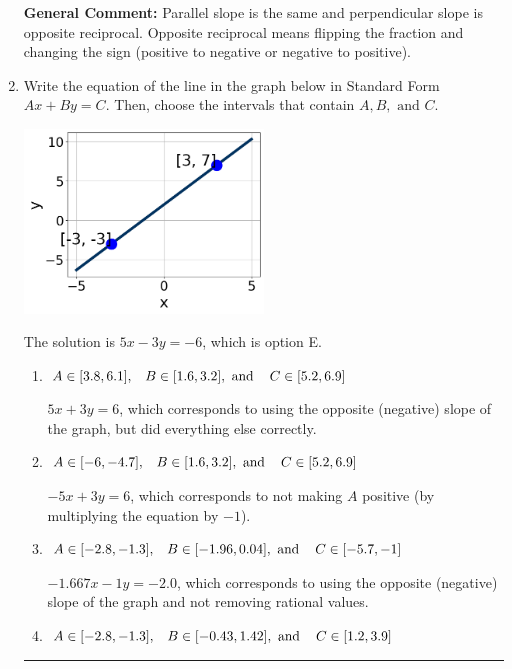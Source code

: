 \documentclass{extbook}[14pt]
\newcommand{\litem}[1]{\item #1

\rule{\textwidth}{0.4pt}}
\begin{document}
\begin{enumerate}
{\textbf{General Comment:} Parallel slope is the same and perpendicular slope is opposite reciprocal. Opposite reciprocal means flipping the fraction and changing the sign (positive to negative or negative to positive).
}
\litem{
Write the equation of the line in the graph below in Standard Form $Ax+By=C$. Then, choose the intervals that contain $A, B, \text{ and } C$.

\begin{center}
    \includegraphics[width=0.5\textwidth]{../Figures/linearGraphToStandardCopyB.png}
\end{center}


The solution is \( 5x - 3y = -6 \), which is option E.\begin{enumerate}[label=\Alph*.]
\item \( A \in [3.8, 6.1], \hspace{3mm} B \in [1.6, 3.2], \text{ and } \hspace{3mm} C \in [5.2, 6.9] \)

 $5x + 3y = 6$, which corresponds to using the opposite (negative) slope of the graph, but did everything else correctly.
\item \( A \in [-6, -4.7], \hspace{3mm} B \in [1.6, 3.2], \text{ and } \hspace{3mm} C \in [5.2, 6.9] \)

 $-5x + 3y = 6$, which corresponds to not making $A$ positive (by multiplying the equation by $-1$).
\item \( A \in [-2.8, -1.3], \hspace{3mm} B \in [-1.96, 0.04], \text{ and } \hspace{3mm} C \in [-5.7, -1] \)

 $-1.667x - 1y = -2.0$, which corresponds to using the opposite (negative) slope of the graph and not removing rational values.
\item \( A \in [-2.8, -1.3], \hspace{3mm} B \in [-0.43, 1.42], \text{ and } \hspace{3mm} C \in [1.2, 3.9] \)


\end{enumerate}}
\end{enumerate}
\end{document}
